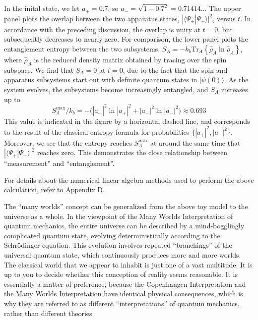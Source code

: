 \documentclass[pra,12pt]{revtex4}
\begin{document}
In the inital state, we let $a_+ = 0.7$, so $a_- = \sqrt{1-0.7^2} =
0.71414\dots$ The upper panel plots the overlap between the two
apparatus states, $|\langle\Psi_+|\Psi_-\rangle|^2$, versus $t$.  In
accordance with the preceding discussion, the overlap is unity at $t =
0$, but subsequently decreases to nearly zero.  For comparison, the
lower panel plots the entanglement entropy between the two subsystems,
$S_A = -k_b \mathrm{Tr}_A\left\{\hat{\rho}_A\ln\hat{\rho}_A\right\}$,
where $\hat{\rho}_A$ is the reduced density matrix obtained by tracing
over the spin subspace.  We find that $S_A = 0$ at $t=0$, due to the
fact that the spin and apparatus subsystems start out with definite
quantum states in $|\psi(0)\rangle$.  As the system evolves, the
subsystems become increasingly entangled, and $S_A$ increases up to
\begin{equation}
  S_A^{\mathrm{max}}/k_b = - \Big( |a_+|^2 \ln|a_+|^2 + |a_-|^2\ln|a_-|^2 \Big) \approx 0.693
\end{equation}
This value is indicated in the figure by a horizontal dashed line, and
corresponds to the result of the classical entropy formula for
probabilities $\{|a_+|^2,|a_-|^2\}$.  Moreover, we see that the
entropy reaches $S_A^{\mathrm{max}}$ at around the same time that
$|\langle\Psi_+|\Psi_-\rangle|^2$ reaches zero.  This demonstrates the
close relationship between ``measurement'' and ``entanglement''.

For details about the numerical linear algebra methods used to perform
the above calculation, refer to Appendix D.

The ``many worlds'' concept can be generalized from the above toy
model to the universe as a whole.  In the viewpoint of the Many Worlds
Interpretation of quantum mechanics, the entire universe can be
described by a mind-bogglingly complicated quantum state, evolving
deterministically according to the Schr\"odinger equation.  This
evolution involves repeated ``branchings'' of the universal quantum
state, which continuously produces more and more worlds.  The
classical world that we appear to inhabit is just one of a vast
multitude.  It is up to you to decide whether this conception of
reality seems reasonable.  It is essentially a matter of preference,
because the Copenhangen Interpretation and the Many Worlds
Interpretation have identical physical consequences, which is why they
are referred to as different ``interpretations'' of quantum mechanics,
rather than different theories.
\end{document}
